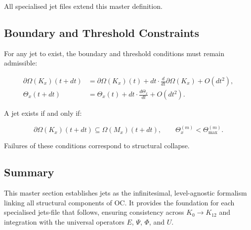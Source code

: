 All specialised jet files extend this master definition.



\subsection{Boundary and Threshold Constraints}

For any jet to exist, the boundary and threshold conditions must remain
admissible:

\begin{align}
\partial\Omega(K_x)(t + dt) &= \partial\Omega(K_x)(t)
  + dt \cdot \frac{d}{dt}\partial\Omega(K_x)
  + O(dt^2), \\
\Theta_x(t + dt) &= \Theta_x(t)
  + dt \cdot \frac{d\Theta_x}{dt}
  + O(dt^2).
\end{align}

A jet exists if and only if:

\[
\partial\Omega(K_x)(t+dt) \subseteq \Omega(M_x)(t+dt),
\qquad
\Theta_x^{(m)} < \Theta_{\mathrm{max}}^{(m)}.
\]

Failures of these conditions correspond to structural collapse.



\subsection{Summary}

This master section establishes jets as the infinitesimal, level-agnostic
formalism linking all structural components of OC. It provides the
foundation for each specialised jets-file that follows, ensuring
consistency across $K_0 \to K_{12}$ and integration with the universal
operators $E$, $\Psi$, $\Phi$, and $U$.
